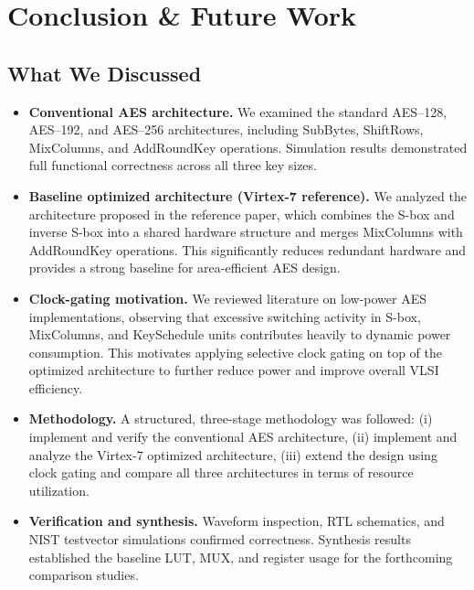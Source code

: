 \chapter{Conclusion \& Future Work}

\section{What We Discussed}

\begin{itemize}
  \item \textbf{Conventional AES architecture.}  
        We examined the standard AES--128, AES--192, and AES--256 architectures, including
        SubBytes, ShiftRows, MixColumns, and AddRoundKey operations.  
        Simulation results demonstrated full functional correctness across all three key sizes.
  
  \item \textbf{Baseline optimized architecture (Virtex-7 reference).}  
        We analyzed the architecture proposed in the reference paper, which combines the
        S-box and inverse S-box into a shared hardware structure and merges MixColumns with
        AddRoundKey operations.  
        This significantly reduces redundant hardware and provides a strong baseline for
        area-efficient AES design.

  \item \textbf{Clock-gating motivation.}  
        We reviewed literature on low-power AES implementations, observing that excessive
        switching activity in S-box, MixColumns, and KeySchedule units contributes heavily to
        dynamic power consumption.  
        This motivates applying selective clock gating on top of the optimized architecture to
        further reduce power and improve overall VLSI efficiency.

  \item \textbf{Methodology.}  
        A structured, three-stage methodology was followed:  
        (i) implement and verify the conventional AES architecture,  
        (ii) implement and analyze the Virtex-7 optimized architecture,  
        (iii) extend the design using clock gating and compare all three architectures in terms
        of resource utilization.

  \item \textbf{Verification and synthesis.}
        Waveform inspection, RTL schematics, and NIST testvector simulations confirmed
        correctness.
        Synthesis results established the baseline LUT, MUX, and register usage for the
        forthcoming comparison studies.


\end{itemize}
